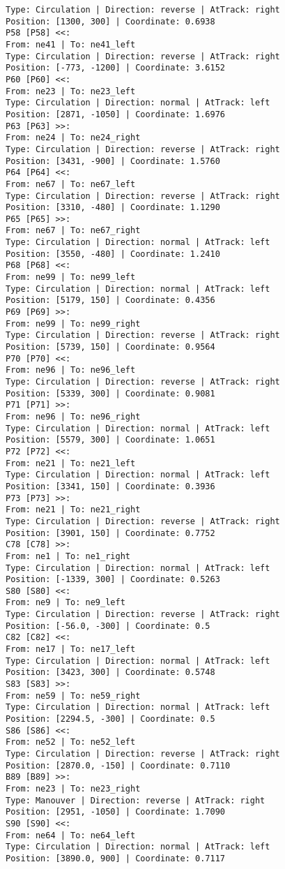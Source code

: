 \begin{lstlisting}[language = {}, tabsize=4, basicstyle=\footnotesize\ttfamily, showspaces=false, showstringspaces=false, caption = Signalling.RNA, label = {lst:EJ3_6}]
Type: Circulation | Direction: reverse | AtTrack: right 
Position: [1300, 300] | Coordinate: 0.6938
P58 [P58] <<:
From: ne41 | To: ne41_left
Type: Circulation | Direction: reverse | AtTrack: right 
Position: [-773, -1200] | Coordinate: 3.6152
P60 [P60] <<:
From: ne23 | To: ne23_left
Type: Circulation | Direction: normal | AtTrack: left 
Position: [2871, -1050] | Coordinate: 1.6976
P63 [P63] >>:
From: ne24 | To: ne24_right
Type: Circulation | Direction: reverse | AtTrack: right 
Position: [3431, -900] | Coordinate: 1.5760
P64 [P64] <<:
From: ne67 | To: ne67_left
Type: Circulation | Direction: reverse | AtTrack: right 
Position: [3310, -480] | Coordinate: 1.1290
P65 [P65] >>:
From: ne67 | To: ne67_right
Type: Circulation | Direction: normal | AtTrack: left 
Position: [3550, -480] | Coordinate: 1.2410
P68 [P68] <<:
From: ne99 | To: ne99_left
Type: Circulation | Direction: normal | AtTrack: left 
Position: [5179, 150] | Coordinate: 0.4356
P69 [P69] >>:
From: ne99 | To: ne99_right
Type: Circulation | Direction: reverse | AtTrack: right 
Position: [5739, 150] | Coordinate: 0.9564
P70 [P70] <<:
From: ne96 | To: ne96_left
Type: Circulation | Direction: reverse | AtTrack: right 
Position: [5339, 300] | Coordinate: 0.9081
P71 [P71] >>:
From: ne96 | To: ne96_right
Type: Circulation | Direction: normal | AtTrack: left 
Position: [5579, 300] | Coordinate: 1.0651
P72 [P72] <<:
From: ne21 | To: ne21_left
Type: Circulation | Direction: normal | AtTrack: left 
Position: [3341, 150] | Coordinate: 0.3936
P73 [P73] >>:
From: ne21 | To: ne21_right
Type: Circulation | Direction: reverse | AtTrack: right 
Position: [3901, 150] | Coordinate: 0.7752
C78 [C78] >>:
From: ne1 | To: ne1_right
Type: Circulation | Direction: normal | AtTrack: left 
Position: [-1339, 300] | Coordinate: 0.5263
S80 [S80] <<:
From: ne9 | To: ne9_left
Type: Circulation | Direction: reverse | AtTrack: right 
Position: [-56.0, -300] | Coordinate: 0.5
C82 [C82] <<:
From: ne17 | To: ne17_left
Type: Circulation | Direction: normal | AtTrack: left 
Position: [3423, 300] | Coordinate: 0.5748
S83 [S83] >>:
From: ne59 | To: ne59_right
Type: Circulation | Direction: normal | AtTrack: left 
Position: [2294.5, -300] | Coordinate: 0.5
S86 [S86] <<:
From: ne52 | To: ne52_left
Type: Circulation | Direction: reverse | AtTrack: right 
Position: [2870.0, -150] | Coordinate: 0.7110
B89 [B89] >>:
From: ne23 | To: ne23_right
Type: Manouver | Direction: reverse | AtTrack: right 
Position: [2951, -1050] | Coordinate: 1.7090
S90 [S90] <<:
From: ne64 | To: ne64_left
Type: Circulation | Direction: normal | AtTrack: left 
Position: [3890.0, 900] | Coordinate: 0.7117

\end{lstlisting}
